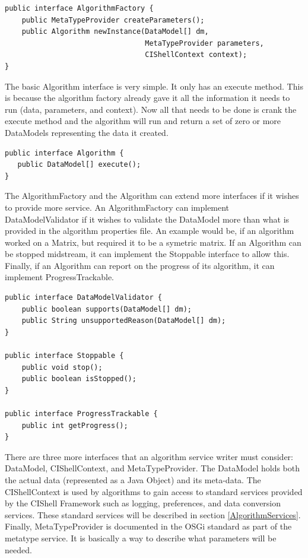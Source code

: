 \documentclass[a4]{article}
\begin{document}
\begin{verbatim}
public interface AlgorithmFactory {
    public MetaTypeProvider createParameters();
    public Algorithm newInstance(DataModel[] dm, 
                                 MetaTypeProvider parameters, 
                                 CIShellContext context);
}
\end{verbatim}

The basic Algorithm interface is very simple. It only has an execute method. 
This is because the algorithm factory already gave it all the information it 
needs to run (data, parameters, and context). Now all that needs to be done is 
crank the execute method and the algorithm will run and return a set of zero or 
more DataModels representing the data it created.

\begin{verbatim}
public interface Algorithm {
   public DataModel[] execute(); 
}
\end{verbatim}

The AlgorithmFactory and the Algorithm can extend more interfaces if it wishes 
to provide more service. An AlgorithmFactory can implement DataModelValidator 
if it wishes to validate the DataModel more than what is provided in the 
algorithm properties file. An example would be, if an algorithm worked on a 
Matrix, but required it to be a symetric matrix. If an Algorithm can be stopped 
midstream, it can implement the Stoppable interface to allow this. 
Finally, if an Algorithm can report on the progress of its algorithm, it can 
implement ProgressTrackable.

\begin{verbatim}
public interface DataModelValidator {
    public boolean supports(DataModel[] dm);
    public String unsupportedReason(DataModel[] dm);
}

public interface Stoppable {
    public void stop();
    public boolean isStopped();
}

public interface ProgressTrackable {
    public int getProgress();
}
\end{verbatim}

There are three more interfaces that an algorithm service writer must consider:
DataModel, CIShellContext, and MetaTypeProvider. The DataModel holds both the actual data
(represented as a Java Object) and its meta-data. The CIShellContext is used by
algorithms to gain access to standard services provided by the CIShell Framework
such as logging, preferences, and data conversion services. These standard
services will be described in section \ref{AlgorithmServices}. Finally,
MetaTypeProvider is documented in the OSGi standard as part of the metatype
service\footnotemark[2]. It is basically a way to describe what parameters will be needed. 
\end{document}
